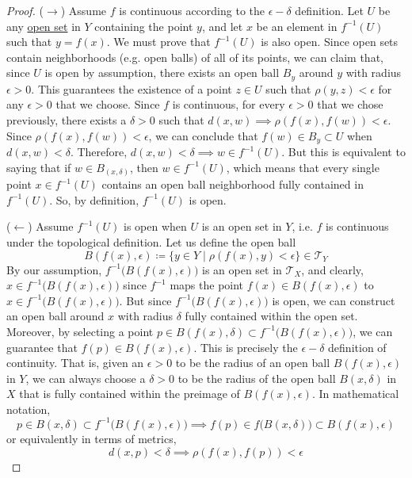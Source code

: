   \begin{proof}
    ($\rightarrow$) Assume $f$ is continuous according to the $\epsilon - \delta$ definition. Let $U$ be any \hyperref[def:open-set]{open set} in $Y$ containing the point $y$, and let $x$ be an element in $f^{-1}(U)$ such that $y = f(x)$. We must prove that $f^{-1}(U)$ is also open. Since open sets contain neighborhoods (e.g. open balls) of all of its points, we can claim that, since $U$ is open by assumption, there exists an open ball $B_y$ around $y$ with radius $\epsilon > 0$. This guarantees the existence of a point $z \in U$ such that $\rho(y, z) < \epsilon$ for any $\epsilon > 0$ that we choose. Since $f$ is continuous, for every $\epsilon >0$ that we chose previously, there exists a $\delta >0$ such that $d(x, w) \implies \rho(f(x), f(w)) < \epsilon$. Since $\rho(f(x), f(w)) < \epsilon$, we can conclude that $f(w) \in B_y \subset U$ when $d(x, w) < \delta$. Therefore, $d(x, w) < \delta \implies w \in f^{-1}(U)$. But this is equivalent to saying that if $w \in B_(x, \delta)$, then $w \in f^{-1}(U)$, which means that every single point $x \in f^{-1}(U)$ contains an open ball neighborhood fully contained in $f^{-1}(U)$. So, by definition, $f^{-1}(U)$ is open. 


    ($\leftarrow$) Assume $f^{-1}(U)$ is open when $U$ is an open set in $Y$, i.e. $f$ is continuous under the topological definition. Let us define the open ball 
    \begin{equation}
      B(f(x), \epsilon) \coloneqq \{ y \in Y \mid \rho(f(x), y) < \epsilon\} \in \mathscr{T}_Y
    \end{equation}
    By our assumption, $f^{-1} \big( B(f(x), \epsilon) \big)$ is an open set in $\mathscr{T}_X$, and clearly, $x \in f^{-1} \big( B(f(x), \epsilon) \big)$ since $f^{-1}$ maps the point $f(x) \in B(f(x), \epsilon)$ to $x \in f^{-1} \big( B(f(x), \epsilon) \big)$. But since $f^{-1} \big( B(f(x), \epsilon) \big)$ is open, we can construct an open ball around $x$ with radius $\delta$ fully contained within the open set. Moreover, by selecting a point $p \in B(f(x), \delta) \subset f^{-1}\big( B(f(x), \epsilon) \big)$, we can guarantee that $f(p) \in B(f(x), \epsilon)$. This is precisely the $\epsilon - \delta$ definition of continuity. That is, given an $\epsilon > 0$ to be the radius of an open ball $B(f(x), \epsilon)$ in $Y$, we can always choose a $\delta > 0$ to be the radius of the open ball $B(x, \delta)$ in $X$ that is fully contained within the preimage of $B(f(x), \epsilon)$. In mathematical notation, 
    \begin{equation}
      p \in B(x, \delta) \subset f^{-1} \big( B(f(x), \epsilon) \big) \implies f(p) \in f\big( B(x, \delta) \big) \subset B(f(x), \epsilon)
    \end{equation}
    or equivalently in terms of metrics,
    \begin{equation}
      d(x, p) < \delta \implies \rho (f(x), f(p)) < \epsilon
    \end{equation}
  \end{proof} 

